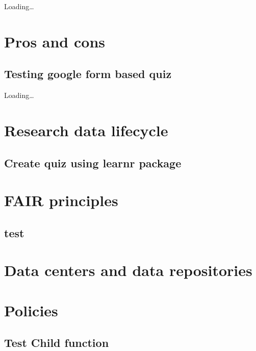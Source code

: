 \documentclass[
]{book}
\begin{document}
Loading\ldots{}

\hypertarget{pros-and-cons}{%
\chapter{Pros and cons}\label{pros-and-cons}}

\hypertarget{testing-google-form-based-quiz}{%
\section{Testing google form based quiz}\label{testing-google-form-based-quiz}}

Loading\ldots{}

\hypertarget{research-data-lifecycle}{%
\chapter{Research data lifecycle}\label{research-data-lifecycle}}

\hypertarget{create-quiz-using-learnr-package}{%
\section{Create quiz using learnr package}\label{create-quiz-using-learnr-package}}

\hypertarget{fair-principles}{%
\chapter{FAIR principles}\label{fair-principles}}

\hypertarget{test}{%
\section{test}\label{test}}

\hypertarget{data-centers-and-data-repositories}{%
\chapter{Data centers and data repositories}\label{data-centers-and-data-repositories}}

\hypertarget{policies}{%
\chapter{Policies}\label{policies}}

\hypertarget{test-child-function}{%
\section{Test Child function}\label{test-child-function}}
\end{document}
